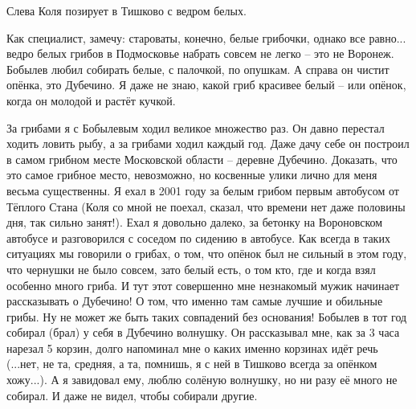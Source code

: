  	     Слева Коля позирует в Тишково с ведром белых. %

 	     Как специалист, замечу: староваты, конечно, белые грибочки, однако все равно... ведро белых грибов в Подмосковье набрать совсем не легко – это не Воронеж. Бобылев любил собирать белые, с палочкой, по опушкам. А справа он чистит опёнка, это Дубечино. Я даже не знаю, какой гриб красивее белый – или опёнок, когда он молодой и растёт кучкой.

За грибами я с Бобылевым ходил великое множество раз. Он давно перестал ходить ловить рыбу, а за грибами ходил каждый год.
Даже дачу себе он построил в самом грибном месте Московской области – деревне Дубечино.
Доказать, что это самое грибное место, невозможно, но косвенные улики лично для меня весьма существенны. Я ехал в 2001 году за белым грибом первым автобусом от Тёплого Стана (Коля со мной не поехал, сказал, что времени нет даже половины дня, так сильно занят!). Ехал я довольно далеко, за бетонку на Вороновском автобусе и разговорился с соседом по сидению в автобусе. Как всегда в таких ситуациях мы говорили о грибах, о том, что опёнок был не сильный в этом году, что чернушки не было совсем, зато белый есть, о том кто, где и когда взял особенно много гриба. И тут этот совершенно мне незнакомый мужик начинает рассказывать о Дубечино! О том, что именно там самые лучшие и обильные грибы. Ну не может же быть таких совпадений без основания! Бобылев в тот год собирал (брал) у себя в Дубечино волнушку. Он рассказывал мне, как за 3 часа нарезал 5 корзин, долго напоминал мне о каких именно корзинах идёт речь (...нет, не та, средняя, а та, помнишь, я с ней в Тишково всегда за опёнком хожу...). А я завидовал ему, люблю солёную волнушку, но ни разу её много не собирал. И даже не видел, чтобы собирали другие.

